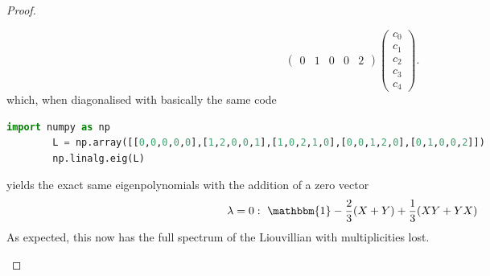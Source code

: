 \begin{proof}
\begin{parts}
\[\begin{pmatrix}
		0 & 1 & 0 & 0 & 2\end{pmatrix} \begin{pmatrix} c_0 \\ c_1 \\ c_2 \\ c_3 \\ c_4 \end{pmatrix} 
	.\] 
	which, when diagonalised with basically the same code
	\begin{lstlisting}[language=Python]
		import numpy as np
		L = np.array([[0,0,0,0,0],[1,2,0,0,1],[1,0,2,1,0],[0,0,1,2,0],[0,1,0,0,2]])
		np.linalg.eig(L)\end{lstlisting}
	yields the exact same eigenpolynomials with the addition of a zero vector
	\[\lambda=0:~\mathbbm{1}- \frac 23(X+Y)+\frac 13(XY+YX)\]
	As expected, this now has the full spectrum of the Liouvillian with multiplicities lost.\qedhere
	\end{parts}
\end{proof}
